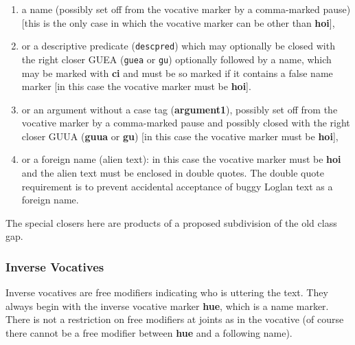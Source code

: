 \documentclass[12pt]{book}
\begin{document}
\begin{enumerate}

\item a name (possibly set off from the vocative marker by a comma-marked pause) [this is the only case in which the vocative marker can be other than {\bf hoi}], 


\item or a descriptive predicate ({\tt descpred}) which may optionally be closed with the right closer GUEA ({\tt guea} or {\tt gu}) optionally followed by a name, which may be marked with {\bf ci} and must be so marked if it contains a false name marker [in this case the vocative marker must be {\bf hoi}].

\item or an argument without a case tag ({\bf argument1}), possibly set off from the vocative marker by a comma-marked pause and possibly closed with the right closer GUUA ({\bf guua} or {\bf gu})  [in this case the vocative marker must be {\bf hoi}],

\item or a foreign name (alien text):  in this case the vocative marker must be {\bf hoi} and the alien text must be enclosed in double quotes.  The double quote requirement is to prevent accidental acceptance of buggy Loglan text as a foreign name.

\end{enumerate}

The special closers here are products of a proposed subdivision of the old class gap.

\subsubsection{Inverse Vocatives}

Inverse vocatives are free modifiers indicating who is uttering the text.  They always begin with the inverse vocative marker {\bf hue}, which is a name marker.  There is not a restriction on free modifiers at joints as in the vocative (of course there cannot be a free modifier between {\bf hue} and a following name).
\end{document}
